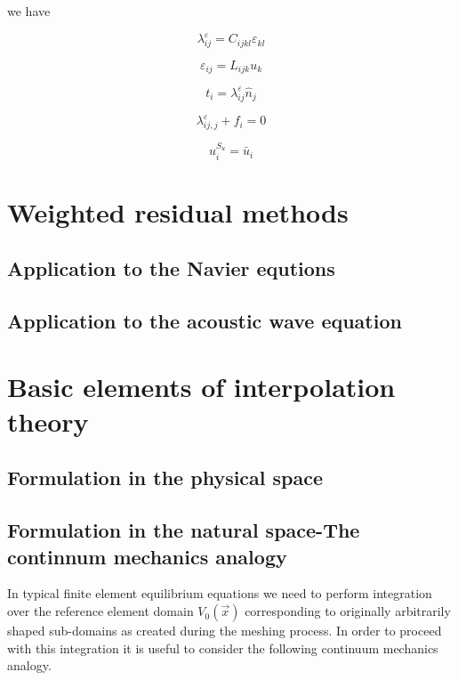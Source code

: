 we have

\begin{equation}
\lambda _{ij}^\varepsilon  = {C_{ijkl}}{\varepsilon _{kl}}
\end{equation}



\begin{equation}
{\varepsilon _{ij}} = {L_{ijk}}{u_k}
\end{equation}



\begin{equation}
{t_i} = \lambda _{ij}^\varepsilon {{\hat n}_j}
\end{equation}



\begin{equation}
\lambda _{ij,j}^\varepsilon  + {f_i} = 0
\end{equation}



\begin{equation}
u_i^{{S_u}} = {{\bar u}_i}
\end{equation}

\section{Weighted residual methods}
\subsection{Application to the Navier equtions}
\subsection{Application to the acoustic wave equation}

\section{Basic elements of interpolation theory}
\subsection{Formulation in the physical space}
\subsection{Formulation in the natural space-The continnum mechanics analogy}
In typical finite element equilibrium equations we need to perform integration over the reference element domain $V_0(\vec{x})$ corresponding to originally arbitrarily shaped sub-domains as created during the meshing process.  In order to proceed with this integration it is useful to consider the following continuum mechanics analogy.


